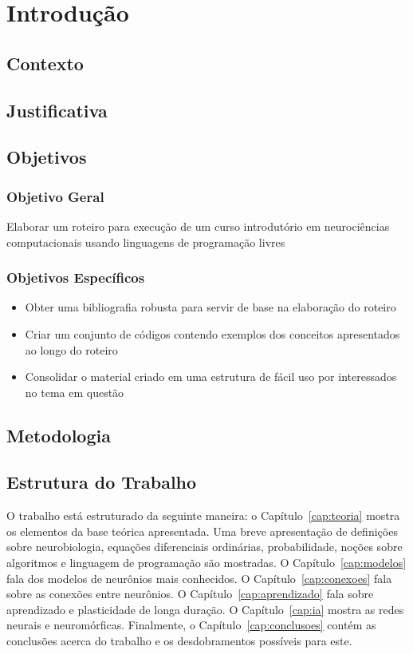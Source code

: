 \chapter{Introdução}\label{cap:introducao}
\section{Contexto}

\section{Justificativa}

\section{Objetivos}
\subsection{Objetivo Geral}
Elaborar um roteiro para execução de um curso introdutório em neurociências computacionais usando linguagens de programação livres

\subsection{Objetivos Específicos}
\begin{itemize}
\item Obter uma bibliografia robusta para servir de base na elaboração do roteiro
\item Criar um conjunto de códigos contendo exemplos dos conceitos apresentados ao longo do roteiro
\item Consolidar o material criado em uma estrutura de fácil uso por interessados no tema em questão
\end{itemize}

\section{Metodologia}

\section{Estrutura do Trabalho}
O trabalho está estruturado da seguinte maneira: o Capítulo~\ref{cap:teoria} mostra os elementos da base teórica apresentada. Uma breve apresentação de definições sobre neurobiologia, equações diferenciais ordinárias, probabilidade, noções sobre algoritmos e linguagem de programação são mostradas. O Capítulo~\ref{cap:modelos} fala dos modelos de neurônios mais conhecidos. O Capítulo~\ref{cap:conexoes} fala sobre as conexões entre neurônios. O Capítulo~\ref{cap:aprendizado} fala sobre aprendizado e plasticidade de longa duração. O Capítulo~\ref{cap:ia} mostra as redes neurais e neuromórficas. Finalmente, o Capítulo~\ref{cap:conclusoes} contém as conclusões acerca do trabalho e os desdobramentos possíveis para este.
